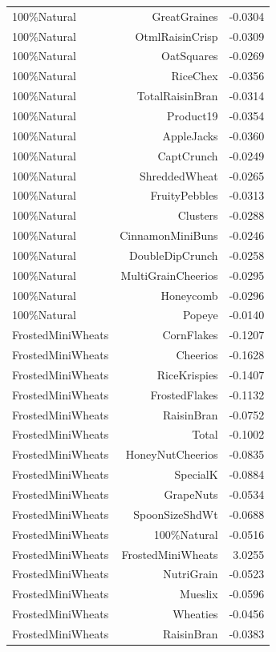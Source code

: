\begin{longtable}{@{}lrr@{}}
100\%Natural & GreatGraines & -0.0304 \\
100\%Natural & OtmlRaisinCrisp & -0.0309 \\
100\%Natural & OatSquares & -0.0269 \\
100\%Natural & RiceChex & -0.0356 \\
100\%Natural & TotalRaisinBran & -0.0314 \\
100\%Natural & Product19 & -0.0354 \\
100\%Natural & AppleJacks & -0.0360 \\
100\%Natural & CaptCrunch & -0.0249 \\
100\%Natural & ShreddedWheat & -0.0265 \\
100\%Natural & FruityPebbles & -0.0313 \\
100\%Natural & Clusters & -0.0288 \\
100\%Natural & CinnamonMiniBuns & -0.0246 \\
100\%Natural & DoubleDipCrunch & -0.0258 \\
100\%Natural & MultiGrainCheerios & -0.0295 \\
100\%Natural & Honeycomb & -0.0296 \\
100\%Natural & Popeye & -0.0140 \\
FrostedMiniWheats & CornFlakes & -0.1207 \\
FrostedMiniWheats & Cheerios & -0.1628 \\
FrostedMiniWheats & RiceKrispies & -0.1407 \\
FrostedMiniWheats & FrostedFlakes & -0.1132 \\
FrostedMiniWheats & RaisinBran & -0.0752 \\
FrostedMiniWheats & Total & -0.1002 \\
FrostedMiniWheats & HoneyNutCheerios & -0.0835 \\
FrostedMiniWheats & SpecialK & -0.0884 \\
FrostedMiniWheats & GrapeNuts & -0.0534 \\
FrostedMiniWheats & SpoonSizeShdWt & -0.0688 \\
FrostedMiniWheats & 100\%Natural & -0.0516 \\
FrostedMiniWheats & FrostedMiniWheats & 3.0255 \\
FrostedMiniWheats & NutriGrain & -0.0523 \\
FrostedMiniWheats & Mueslix & -0.0596 \\
FrostedMiniWheats & Wheaties & -0.0456 \\
FrostedMiniWheats & RaisinBran & -0.0383 \\

\end{longtable}
